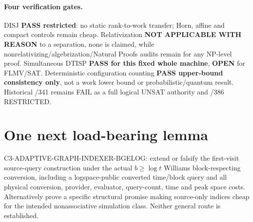 \documentclass[11pt]{article}
\begin{document}
\paragraph{Four verification gates.}
DISJ \textbf{PASS restricted}: no static rank-to-work transfer;
Horn, affine and compact controls remain cheap.
Relativization \textbf{NOT APPLICABLE WITH REASON} to a separation,
none is claimed, while nonrelativizing/algebrization/Natural Proofs
audits remain for any NP-level proof. Simultaneous DTISP
\textbf{PASS for this fixed whole machine}, \textbf{OPEN}
for FLMV/SAT. Deterministic configuration counting
\textbf{PASS upper-bound consistency only}, not a work lower
bound or probabilistic/quantum result.
Historical /341 remains FAIL as a full logical UNSAT
authority and /386 RESTRICTED.

\section{One next load-bearing lemma}
\textsf{C3-ADAPTIVE-GRAPH-INDEXER-BGELOG}: extend or falsify
the first-visit source-query construction under the actual
$b\ge\log t$ Williams block-respecting conversion, including
a logspace-public converted time/block query and all physical
conversion, provider, evaluator, query-count, time and peak
space costs. Alternatively prove a specific structural promise
making source-only indices cheap for the intended nonassociative
simulation class. Neither general route is established.
\end{document}
